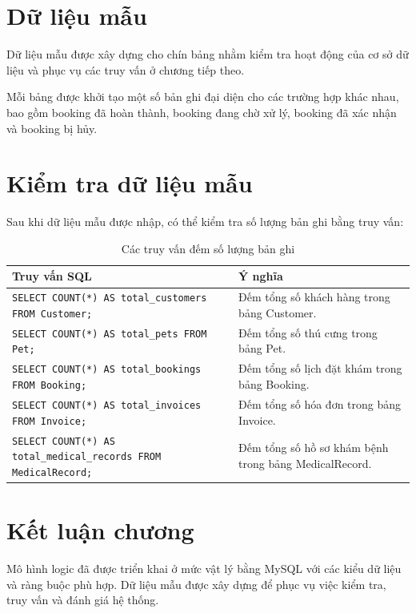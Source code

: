 \section{Dữ liệu mẫu}

Dữ liệu mẫu được xây dựng cho chín bảng nhằm kiểm tra hoạt động của cơ sở dữ liệu và phục vụ các truy vấn ở chương tiếp theo.

Mỗi bảng được khởi tạo một số bản ghi đại diện cho các trường hợp khác nhau, bao gồm booking đã hoàn thành, booking đang chờ xử lý, booking đã xác nhận và booking bị hủy.

\section{Kiểm tra dữ liệu mẫu}

Sau khi dữ liệu mẫu được nhập, có thể kiểm tra số lượng bản ghi bằng truy vấn:

\begin{table}[htbp]
    \centering
    \caption{Các truy vấn đếm số lượng bản ghi}
    \label{tab:count_queries}
    \begin{tabularx}{\textwidth}{|p{7cm}|X|}
        \hline
        \textbf{Truy vấn SQL} & \textbf{Ý nghĩa} \\ \hline

        \texttt{SELECT COUNT(*) AS total\_customers FROM Customer;}
        & Đếm tổng số khách hàng trong bảng Customer.
        \\ \hline

        \texttt{SELECT COUNT(*) AS total\_pets FROM Pet;}
        & Đếm tổng số thú cưng trong bảng Pet.
        \\ \hline

        \texttt{SELECT COUNT(*) AS total\_bookings FROM Booking;}
        & Đếm tổng số lịch đặt khám trong bảng Booking.
        \\ \hline

        \texttt{SELECT COUNT(*) AS total\_invoices FROM Invoice;}
        & Đếm tổng số hóa đơn trong bảng Invoice.
        \\ \hline

        \texttt{SELECT COUNT(*) AS total\_medical\_records FROM MedicalRecord;}
        & Đếm tổng số hồ sơ khám bệnh trong bảng MedicalRecord.
        \\ \hline

    \end{tabularx}
\end{table}

\section{Kết luận chương}

Mô hình logic đã được triển khai ở mức vật lý bằng MySQL với các kiểu dữ liệu và ràng buộc phù hợp. Dữ liệu mẫu được xây dựng để phục vụ việc kiểm tra, truy vấn và đánh giá hệ thống.